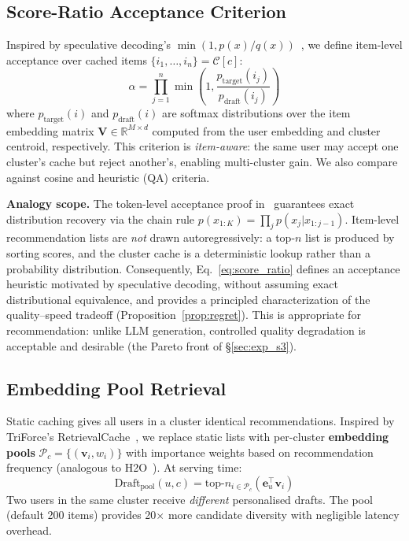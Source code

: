\documentclass[sigconf,nonacm=false]{acmart}
\begin{document}
\subsection{Score-Ratio Acceptance Criterion}
\label{sec:acceptance}

Inspired by speculative decoding's $\min(1, p(x)/q(x))$~\cite{leviathan2023}, we define item-level acceptance over cached items $\{i_1, \ldots, i_n\} = \mathcal{C}[c]$:
\begin{equation}
\alpha = \prod_{j=1}^{n} \min\!\left(1, \frac{p_{\text{target}}(i_j)}{p_{\text{draft}}(i_j)}\right)
\label{eq:score_ratio}
\end{equation}
where $p_{\text{target}}(i)$ and $p_{\text{draft}}(i)$ are softmax distributions over the item embedding matrix $\mathbf{V}\!\in\!\mathbb{R}^{M\times d}$ computed from the user embedding and cluster centroid, respectively. This criterion is \emph{item-aware}: the same user may accept one cluster's cache but reject another's, enabling multi-cluster gain. We also compare against cosine and heuristic (QA) criteria.

\textbf{Analogy scope.} The token-level acceptance proof in~\cite{leviathan2023} guarantees exact distribution recovery via the chain rule $p(x_{1:K}) = \prod_j p(x_j|x_{1:j-1})$. Item-level recommendation lists are \emph{not} drawn autoregressively: a top-$n$ list is produced by sorting scores, and the cluster cache is a deterministic lookup rather than a probability distribution. Consequently, Eq.~\ref{eq:score_ratio} defines an acceptance heuristic motivated by speculative decoding, without assuming exact distributional equivalence, and provides a principled characterization of the quality--speed tradeoff (Proposition~\ref{prop:regret}). This is appropriate for recommendation: unlike LLM generation, controlled quality degradation is acceptable and desirable (the Pareto front of \S\ref{sec:exp_s3}).

\subsection{Embedding Pool Retrieval}
\label{sec:pool_retrieval}

Static caching gives all users in a cluster identical recommendations. Inspired by TriForce's RetrievalCache~\cite{triforce2024}, we replace static lists with per-cluster \textbf{embedding pools} $\mathcal{P}_c = \{(\mathbf{v}_{i}, w_i)\}$ with importance weights based on recommendation frequency (analogous to H2O~\cite{h2o2023}). At serving time:
\begin{equation}
\text{Draft}_{\text{pool}}(u, c) = \text{top-}n_{i \in \mathcal{P}_c} \left( \mathbf{e}_u^\top \mathbf{v}_i \right)
\label{eq:pool_retrieval}
\end{equation}
Two users in the same cluster receive \emph{different} personalised drafts. The pool (default 200 items) provides 20$\times$ more candidate diversity with negligible latency overhead.
\end{document}
